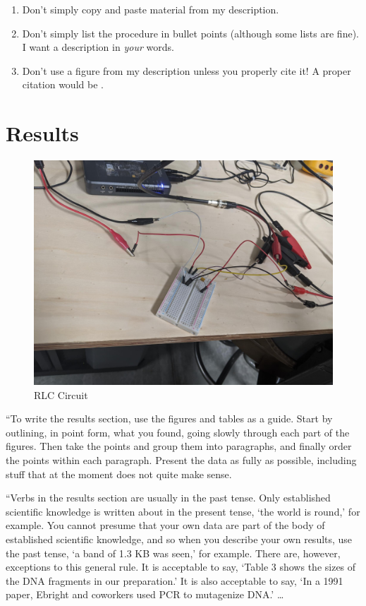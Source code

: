 \documentclass[10pt,twocolumn]{article}
\begin{document}
\begin{enumerate}
\item 
Don't simply copy and paste material from my description. 
\item 
Don't simply list the procedure in bullet points (although some lists are fine). I want a description in \emph{your} words.
\item
Don't use a figure from my description unless you properly cite it! A proper citation would be \citep[p.~32]{Picone2018}.
\end{enumerate}

\section{Results}
\label{sec:results}

\begin{figure}[bt]
	\centering
	\includegraphics[width=.9\linewidth]{figures/RLCcircuit.PNG}
	\caption{RLC Circuit}
	\label{fig:data}
\end{figure}
``To write the results section, use the figures and tables as a guide. Start by outlining, in point form, what you found, going slowly through each part of the figures. Then take the points and group them into paragraphs, and finally order the points within each paragraph. Present the data as fully as possible, including stuff that at the moment does not quite make sense.

``Verbs in the results section are usually in the past tense. Only established scientific knowledge is written about in the present tense, `the world is round,' for example. You cannot presume that your own data are part of the body of established scientific knowledge, and so when you describe your own results, use the past tense, `a band of 1.3 KB was seen,' for example. There are, however, exceptions to this general rule. It is acceptable to say, `Table 3 shows the sizes of the DNA fragments in our preparation.' It is also acceptable to say, `In a 1991 paper, Ebright and coworkers used PCR to mutagenize DNA.' \ldots
\end{document}
